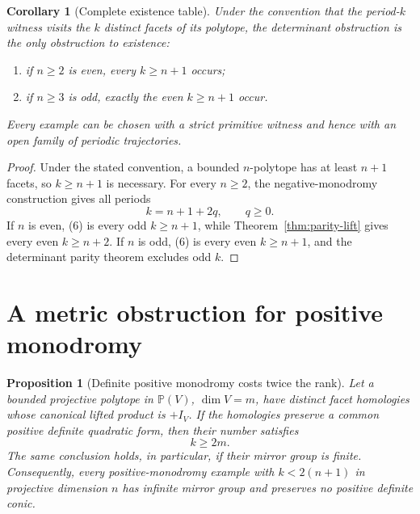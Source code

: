\documentclass[11pt,a4paper]{article}
\theoremstyle{plain}
\newtheorem{proposition}[theorem]{Proposition}
\newtheorem{corollary}[theorem]{Corollary}
\theoremstyle{definition}
\theoremstyle{remark}
\begin{document}
\begin{corollary}[Complete existence table]
\label{cor:complete-existence-table}
Under the convention that the period-$k$ witness visits the $k$ distinct facets
of its polytope, the determinant obstruction is the only obstruction to
existence:
\begin{enumerate}
\item if $n\ge2$ is even, every $k\ge n+1$ occurs;
\item if $n\ge3$ is odd, exactly the even $k\ge n+1$ occur.
\end{enumerate}
Every example can be chosen with a strict primitive witness and hence with an open
family of periodic trajectories.
\end{corollary}

\begin{proof}
Under the stated convention, a bounded $n$-polytope has at least $n+1$ facets,
so $k\ge n+1$ is necessary.  For every $n\ge2$, the negative-monodromy
construction gives all periods
\[
                         k=n+1+2q,\qquad q\ge0.             \tag{6}
\]
If $n$ is even, (6) is every odd $k\ge n+1$, while
Theorem~\ref{thm:parity-lift} gives every even $k\ge n+2$.  If $n$ is odd, (6)
is every even $k\ge n+1$, and the determinant parity theorem excludes odd $k$.
\end{proof}

\section{A metric obstruction for positive monodromy}
\begin{proposition}[Definite positive monodromy costs twice the rank]
\label{prop:finite-positive-twice-rank}
Let a bounded projective polytope in $\mathbb P(V)$, $\dim V=m$, have distinct
facet homologies whose canonical lifted product is $+I_V$.  If the homologies
preserve a common positive definite quadratic form, then their number satisfies
\[
                              k\ge2m.
\]
The same conclusion holds, in particular, if their mirror group is finite.
Consequently, every positive-monodromy example with $k<2(n+1)$ in projective
dimension $n$ has infinite mirror group and preserves no positive definite conic.
\end{proposition}
\end{document}
